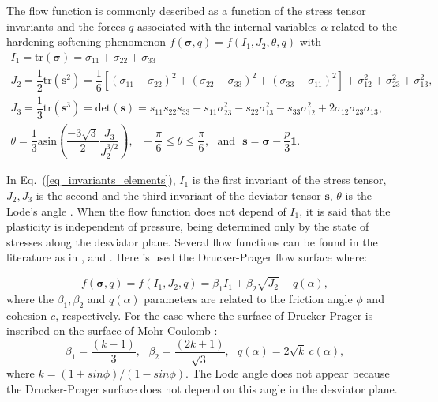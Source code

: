 \documentclass[Journal,letterpaper]{ascelike-new}
\newcommand{\onell}{\boldsymbol{1}}
\newcommand{\sll}{\boldsymbol{s}}
\newcommand{\stress}{\boldsymbol{\sigma}}
\begin{document}
The flow function is commonly described as a function of the stress tensor invariants and the forces $q$ associated with the internal variables $\alpha$ related to the hardening-softening phenomenon $f(\stress,q) = f(I_1,J_2,\theta,q)$ with
\begin{equation} \label{eq_invariants_elements}
	\begin{array}{lcl}
		I_1 = \text{tr}(\stress) = \sigma_{11}+\sigma_{22}+\sigma_{33}\\
		J_2 = \dfrac{1}{2}\text{tr}(\sll^2) = \dfrac{1}{6}\left[ (\sigma_{11}-\sigma_{22})^2 + (\sigma_{22}-\sigma_{33})^2 + (\sigma_{33}-\sigma_{11})^2 \right] + \sigma_{12}^2+ \sigma_{23}^2+ \sigma_{13}^2, \\
		J_3 = \dfrac{1}{3}\text{tr}(\sll^3) = \text{det}(\sll) = s_{11}s_{22}s_{33}-s_{11}\sigma_{23}^2-s_{22}\sigma_{13}^2-s_{33}\sigma_{12}^2+2\sigma_{12}\sigma_{23}\sigma_{13}, \\ 
		\theta = \dfrac{1}{3}\text{asin}\left( \dfrac{-3\sqrt{3}}{2} \dfrac{J_3}{J_2^{3/2}} \right),~~~
		-\dfrac{\pi}{6} \le \theta \le \dfrac{\pi}{6},~~~\text{and}~~~\sll = \stress - \dfrac{p}{3}\onell.
	\end{array}\;
\end{equation}

In Eq.~(\ref{eq_invariants_elements}), $I_1$ is the first invariant of the stress tensor, $J_2,J_3$ is the second and the third invariant of the deviator tensor $\sll$, $\theta$ is the Lode's angle \cite{chen1988}. When the flow function does not depend of $I_1$, it is said that the plasticity is independent of pressure, being determined only by the state of stresses along the desviator plane. Several flow functions can be found in the literature as in ,  and . Here is used the Drucker-Prager flow surface where:

\begin{equation}
	\label{eq:f_Drucker_Prager}
	f(\stress,q) = f(I_1,J_2,q) = \beta_1 I_1 +\beta_2 \sqrt{J_2}-q(\alpha),
\end{equation}
where the $\beta_1, \beta_2$ and $q(\alpha)$ parameters are related to the friction angle $\phi$ and cohesion $c$, respectively. For the case where the surface of Drucker-Prager is inscribed on the surface of Mohr-Coulomb \cite{bernaud1991}:
\begin{equation}
	\label{eq:f_DP_inscrita_MC}
	\beta_1 = \dfrac{(k-1)}{3}, ~~~ \beta_2 = \dfrac{(2k+1)}{\sqrt{3}}, ~~~
	q(\alpha) = 2\sqrt{k}~c(\alpha),
\end{equation}
where $k = (1+sin{\phi})/(1-sin{\phi})$. The Lode angle does not appear because the Drucker-Prager surface does not depend on this angle in the desviator plane.
\end{document}
